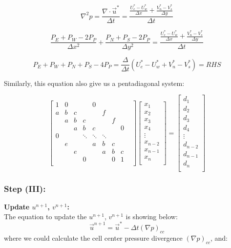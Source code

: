 \documentclass[12pt]{article}
\begin{document}
$$
    \nabla^2 p = \frac{\nabla \cdot \vec{u}^*}{\Delta t}= \frac{\frac{U_e^* - U_w^*}{\Delta x} + \frac{V_n^* - V_s^*}{\Delta y}}{\Delta t}
$$

$$
\frac{P_E + P_W - 2P_P}{\Delta x^2} + \frac{P_N + P_S - 2P_P}{\Delta y^2} = \frac{\frac{U_e^* - U_w^*}{\Delta x} + \frac{V_n^* - V_s^*}{\Delta y}}{\Delta t}
$$

$$
P_E + P_W + P_N + P_S - 4P_P = \frac{\Delta}{\Delta t} \left( U_e^* - U_w^* + V_n^* - V_s^* \right) = RHS
$$

Similarly, this equation also give us a pentadiagonal system:


\[
\begin{bmatrix}
1 & 0 &   &   & 0 &   &    &\\
a & b & c &   &   & f &    &\\
  & a & b & c &   &   & f  &\\
  &   & a & b & c &   &    & 0\\
0 &   &   & \ddots & \ddots & \ddots &  &  \\
  & e &   &   & a & b & c &   &\\
  &   & e &   &   & a & b & c \\
  &   &   & 0 &   &   & 0 & 1 \\
\end{bmatrix}
\begin{bmatrix}
x_1 \\
x_2 \\
x_3 \\
x_4 \\
\vdots \\
x_{n-2} \\
x_{n-1} \\
x_n \\
\end{bmatrix}
=
\begin{bmatrix}
d_1 \\
d_2 \\
d_3 \\
d_4 \\
\vdots \\
d_{n-2} \\
d_{n-1} \\
d_n \\
\end{bmatrix}
\]





\subsubsection{Step (III):}
\textbf{Update $u^{n+1}$, $v^{n+1}$:}\\
The equation to update the $u^{n+1}$, $v^{n+1}$ is showing below:
$$
\vec{u}^{n+1} = \vec{u}^* - \Delta t (\nabla p)_{cc}
$$
where we could calculate the cell center pressure divergence $(\nabla p)_{cc}$, and:
\end{document}

